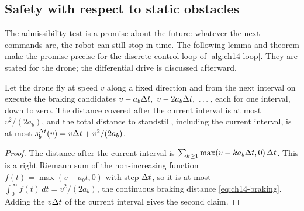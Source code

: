 \subsection{Safety with respect to static obstacles}

The admissibility test is a promise about the future: whatever the next
commands are, the robot can still stop in time. The following lemma and
theorem make the promise precise for the discrete control loop of
\cref{alg:ch14-loop}. They are stated for the drone; the differential drive
is discussed afterward.

\begin{lemma}
\label{thm:ch14-braking-lemma}
Let the drone fly at speed $v$ along a fixed direction and from the next
interval on execute the braking candidates $v - a_b\dt,\ v - 2a_b\dt,\ \dots$,
each for one interval, down to zero. The distance covered after the current
interval is at most $v^2/(2a_b)$, and the total distance to standstill,
including the current interval, is at most $s_b^{\Delta t}(v) = v\Delta t + v^2/(2a_b)$.
\end{lemma}
\begin{proof}
The distance after the current interval is
$\sum_{k \ge 1} \max(v - k a_b\Delta t, 0)\,\Delta t$. This is a right Riemann sum of
the non-increasing function $f(t) = \max(v - a_b t, 0)$ with step $\Delta t$, so it
is at most $\int_0^\infty f(t)\,dt = v^2/(2a_b)$, the continuous braking
distance \cref{eq:ch14-braking}. Adding the $v\Delta t$ of the current interval
gives the second claim.
\end{proof}


